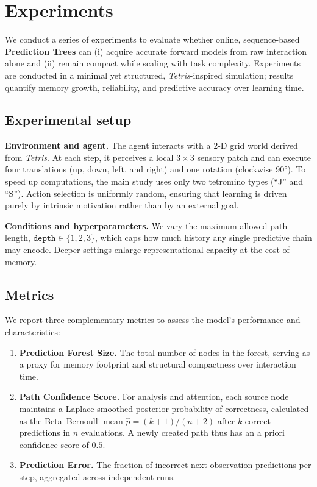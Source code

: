 \documentclass[11pt]{article}
\begin{document}
\section{Experiments}

We conduct a series of experiments to evaluate whether online, sequence-based \textbf{Prediction Trees} can (i) acquire accurate forward models from raw interaction alone and (ii) remain compact while scaling with task complexity. Experiments are conducted in a minimal yet structured, \emph{Tetris}-inspired simulation; results quantify memory growth, reliability, and predictive accuracy over learning time.

\subsection{Experimental setup}

\textbf{Environment and agent.} The agent interacts with a 2-D grid world derived from \emph{Tetris}. At each step, it perceives a local $3\times 3$ sensory patch and can execute four translations (up, down, left, and right) and one rotation (clockwise 90°). To speed up computations, the main study uses only two tetromino types (“J” and “S”). Action selection is uniformly random, ensuring that learning is driven purely by intrinsic motivation rather than by an external goal.

\textbf{Conditions and hyperparameters.} We vary the maximum allowed path length, $\texttt{depth} \in \{1, 2, 3\}$, which caps how much history any single predictive chain may encode. Deeper settings enlarge representational capacity at the cost of memory.

\subsection{Metrics}

We report three complementary metrics to assess the model's performance and characteristics:

\begin{enumerate}[itemsep=0.2em]
\item \textbf{Prediction Forest Size.} The total number of nodes in the forest, serving as a proxy for memory footprint and structural compactness over interaction time.
\item \textbf{Path Confidence Score.} For analysis and attention, each source node maintains a Laplace-smoothed posterior probability of correctness, calculated as the Beta–Bernoulli mean $\hat{p}=(k+1)/(n+2)$ after $k$ correct predictions in $n$ evaluations. A newly created path thus has an a priori confidence score of $0.5$.
\item \textbf{Prediction Error.} The fraction of incorrect next-observation predictions per step, aggregated across independent runs.
\end{enumerate}
\end{document}
